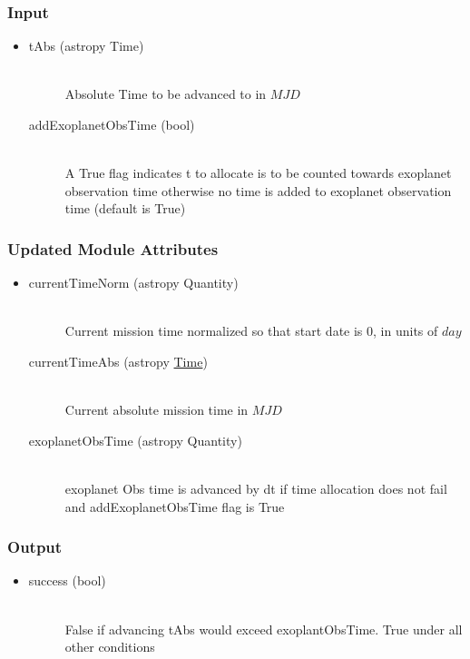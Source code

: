 \documentclass[cleanfoot]{asme2ej}
\begin{document}
\subsubsection*{Input}
\begin{itemize}
\item 
\begin{description}
    \item[tAbs (astropy Time)] \hfill \\ Absolute Time to be advanced to in $ MJD $
    \item[addExoplanetObsTime (bool)] \hfill \\ A True flag indicates t to allocate is to be counted towards exoplanet observation time otherwise no time is added to exoplanet observation time (default is True)
\end{description}
\end{itemize}
\subsubsection*{Updated Module Attributes}
\begin{itemize}
\item 
\begin{description}
    \item[currentTimeNorm (astropy Quantity)] \hfill \\ Current mission time normalized so that start date is 0, in units of $ day $
    \item[currentTimeAbs (astropy \href{http://astropy.readthedocs.org/en/latest/time/index.html}{Time})] \hfill \\ Current absolute mission time in $ MJD $
    \item[exoplanetObsTime (astropy Quantity)] \hfill \\ exoplanet Obs time is advanced by dt if time allocation does not fail and addExoplanetObsTime flag is True
\end{description}
\end{itemize}
\subsubsection*{Output}
\begin{itemize}
\item 
\begin{description}
    \item[success (bool)] \hfill \\ False if advancing tAbs would exceed exoplantObsTime. True under all other conditions
\end{description}
\end{itemize}
\end{document}
